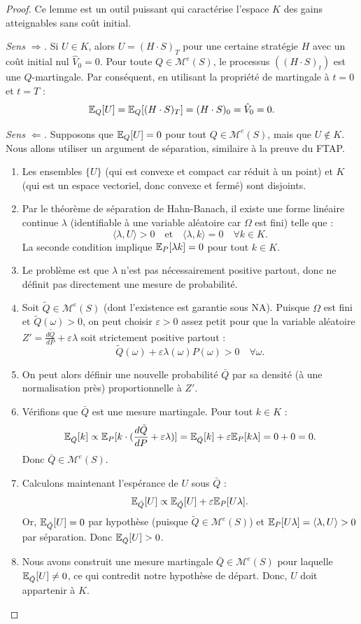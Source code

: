 \begin{proof}
Ce lemme est un outil puissant qui caractérise l'espace $K$ des gains atteignables sans coût initial.

\emph{Sens $\Rightarrow$.} Si $U\in K$, alors $U = (H\cdot S)_T$ pour une certaine stratégie $H$ avec un coût initial nul $\hat{V}_0=0$. Pour toute $Q\in\mathcal{M}^e(S)$, le processus $((H\cdot S)_t)$ est une $Q$-martingale. Par conséquent, en utilisant la propriété de martingale à $t=0$ et $t=T$ :
\[
\mathbb{E}_Q[U] = \mathbb{E}_Q[(H\cdot S)_T] = (H\cdot S)_0 = \hat{V}_0 = 0.
\]

\emph{Sens $\Leftarrow$.} Supposons que $\mathbb{E}_Q[U] = 0$ pour tout $Q \in \mathcal{M}^e(S)$, mais que $U \notin K$.
Nous allons utiliser un argument de séparation, similaire à la preuve du FTAP.
\begin{enumerate}
    \item Les ensembles $\{U\}$ (qui est convexe et compact car réduit à un point) et $K$ (qui est un espace vectoriel, donc convexe et fermé) sont disjoints.
    \item Par le théorème de séparation de Hahn-Banach, il existe une forme linéaire continue $\lambda$ (identifiable à une variable aléatoire car $\Omega$ est fini) telle que :
    \[
    \langle \lambda, U \rangle > 0 \quad \text{et} \quad \langle \lambda, k \rangle = 0 \quad \forall k \in K.
    \]
    La seconde condition implique $\mathbb{E}_P[\lambda k] = 0$ pour tout $k \in K$.
    \item Le problème est que $\lambda$ n'est pas nécessairement positive partout, donc ne définit pas directement une mesure de probabilité.
    \item Soit $\tilde{Q} \in \mathcal{M}^e(S)$ (dont l'existence est garantie sous NA). Puisque $\Omega$ est fini et $\tilde{Q}(\omega)>0$, on peut choisir $\varepsilon > 0$ assez petit pour que la variable aléatoire $Z' = \frac{d\tilde{Q}}{dP} + \varepsilon \lambda$ soit strictement positive partout :
    \[
    \tilde{Q}(\omega) + \varepsilon \lambda(\omega) P(\omega) > 0 \quad \forall \omega.
    \]
    \item On peut alors définir une nouvelle probabilité $\bar{Q}$ par sa densité (à une normalisation près) proportionnelle à $Z'$.
    \item Vérifions que $\bar{Q}$ est une mesure martingale. Pour tout $k \in K$ :
    \[
    \mathbb{E}_{\bar{Q}}[k] \propto \mathbb{E}_P[k \cdot (\frac{d\tilde{Q}}{dP} + \varepsilon \lambda)] = \mathbb{E}_{\tilde{Q}}[k] + \varepsilon \mathbb{E}_P[k \lambda] = 0 + 0 = 0.
    \]
    Donc $\bar{Q} \in \mathcal{M}^e(S)$.
    \item Calculons maintenant l'espérance de $U$ sous $\bar{Q}$ :
    \[
    \mathbb{E}_{\bar{Q}}[U] \propto \mathbb{E}_{\tilde{Q}}[U] + \varepsilon \mathbb{E}_P[U \lambda].
    \]
    Or, $\mathbb{E}_{\tilde{Q}}[U]=0$ par hypothèse (puisque $\tilde{Q} \in \mathcal{M}^e(S)$) et $\mathbb{E}_P[U \lambda] = \langle \lambda, U \rangle > 0$ par séparation.
    Donc $\mathbb{E}_{\bar{Q}}[U] > 0$.
    \item Nous avons construit une mesure martingale $\bar{Q} \in \mathcal{M}^e(S)$ pour laquelle $\mathbb{E}_{\bar{Q}}[U] \neq 0$, ce qui contredit notre hypothèse de départ. Donc, $U$ doit appartenir à $K$.
\end{enumerate}
\end{proof}

